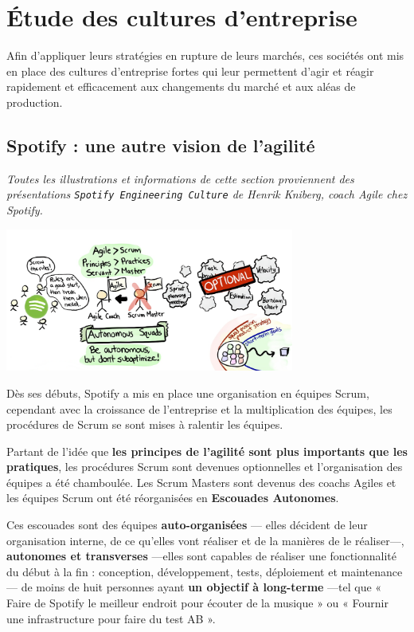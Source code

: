 \chapter{Étude des cultures d'entreprise}

Afin d'appliquer leurs stratégies en rupture de leurs marchés, ces sociétés ont mis en place des cultures d'entreprise fortes qui leur permettent d'agir et réagir rapidement et efficacement aux changements du marché et aux aléas de production.

\section{Spotify : une autre vision de l'agilité}

\textit{Toutes les illustrations et informations de cette section proviennent des présentations \texttt{Spotify Engineering Culture}\supercite{SpotifyEngineeringCulturePart1}\supercite{SpotifyEngineeringCulturePart2} de Henrik Kniberg, coach Agile chez Spotify.}

\begin{center}
\includegraphics[width=95mm]{./images_spotify/agile_scrum}
\end{center}

Dès ses débuts, Spotify a mis en place une organisation en équipes Scrum, cependant avec la croissance de l'entreprise et la multiplication des équipes, les procédures de Scrum se sont mises à ralentir les équipes.

Partant de l'idée que \textbf{les principes de l'agilité sont plus importants que les pratiques}, les procédures Scrum sont devenues optionnelles et l'organisation des équipes a été chamboulée. Les Scrum Masters sont devenus des coachs Agiles et les équipes Scrum ont été réorganisées en \textbf{Escouades Autonomes}.

Ces escouades sont des équipes \textbf{auto-organisées} --- elles décident de leur organisation interne, de ce qu'elles vont réaliser et de la manières de le réaliser---, \textbf{autonomes et transverses} ---elles sont capables de réaliser une fonctionnalité du début à la fin : conception, développement, tests, déploiement et maintenance--- de moins de huit personnes ayant \textbf{un objectif à long-terme} ---tel que « Faire de Spotify le meilleur endroit pour écouter de la musique » ou « Fournir une infrastructure pour faire du test AB ».

